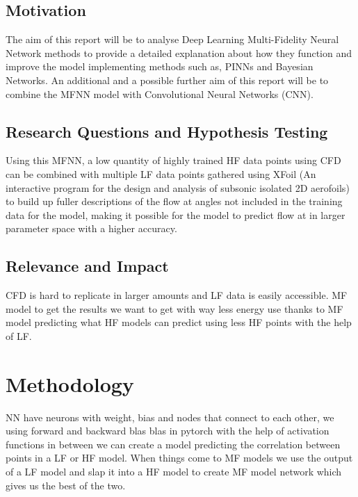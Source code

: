 \documentclass[12pt,letterpaper]{article}
\begin{document}
    \subsection{Motivation} \label{motivation}
    \vspace{-1.5em}
    The aim of this report will be to analyse Deep Learning Multi-Fidelity Neural Network methods to provide a detailed explanation about how they function and improve the model implementing methods such as, PINNs and Bayesian Networks. An additional and a possible further aim of this report will be to combine the MFNN model with Convolutional Neural Networks
    (CNN).

       
    
\subsection{Research Questions and Hypothesis Testing}
\vspace{-1.5em}

Using this MFNN, a low quantity of highly trained HF data points using CFD can be combined with multiple LF data points gathered using XFoil (An interactive program for the design and analysis of subsonic isolated 2D aerofoils) to build up fuller descriptions of the flow at angles not included in the training data for the model, making it possible for the model to predict flow at in larger parameter space with a higher accuracy.

\subsection{Relevance and Impact}
\vspace{-1.5em}
    
    CFD is hard to replicate in larger amounts and LF data is easily accessible. MF model to get the results we want to get with way less energy use thanks to MF model predicting what HF models can predict using less HF points with the help of LF.



\newpage
\section{Methodology} \label{methodology}
\vspace{-1.5em}


        NN have neurons with weight, bias and nodes that connect to each other, we using forward and backward blas blas in pytorch with the help of activation functions in between we can create a model predicting the correlation between points in a LF or HF model. When things come to MF models we use the output of a LF model and slap it into a HF model to create MF model network which gives us the best of the two. 
        
\end{document}
